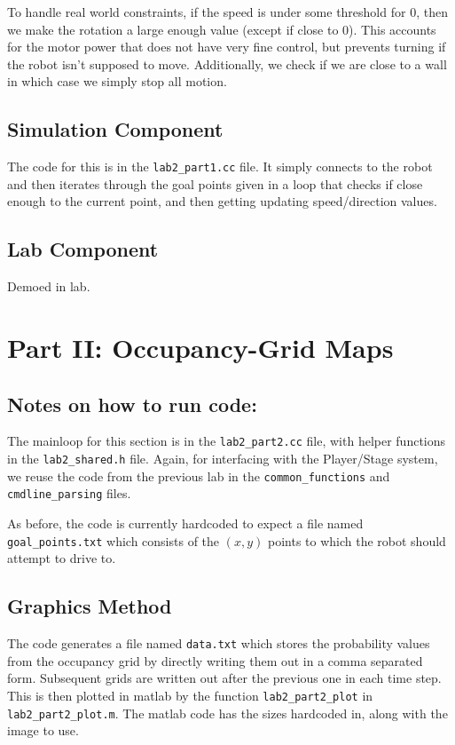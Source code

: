 \documentclass[10pt, titlepage, onecolumn, fleqn]{article}
\begin{document}
To handle real world constraints, if the speed is under some threshold for 0, then we make the rotation a large enough value (except if close to 0). This accounts for the motor power that does not have very fine control, but prevents turning if the robot isn't supposed to move. Additionally, we check if we are close to a wall in which case we simply stop all motion.

\subsection{Simulation Component}

The code for this is in the \verb|lab2_part1.cc| file. It simply connects to the robot and then iterates through the goal points given in a loop that checks if close enough to the current point, and then getting updating speed/direction values.

\subsection{Lab Component}

Demoed in lab.

\section{Part II: Occupancy-Grid Maps}

\subsection*{Notes on how to run code:}

The mainloop for this section is in the \verb|lab2_part2.cc| file, with helper functions in the \verb|lab2_shared.h| file. Again, for interfacing with the Player/Stage system, we reuse the code from the previous lab in the \verb|common_functions| and \verb|cmdline_parsing| files.

As before, the code is currently hardcoded to expect a file named \verb|goal_points.txt| which consists of the $(x,y)$ points to which the robot should attempt to drive to.

\subsection*{Graphics Method}

The code generates a file named \verb|data.txt| which stores the probability values from the occupancy grid by directly writing them out in a comma separated form. Subsequent grids are written out after the previous one in each time step. This is then plotted in matlab by the function \verb|lab2_part2_plot| in \verb|lab2_part2_plot.m|. The matlab code has the sizes hardcoded in, along with the image to use.
\end{document}
